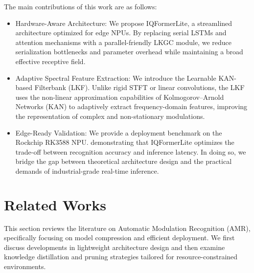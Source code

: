 \documentclass{article}
\begin{document}
	The main contributions of this work are as follows:
	\begin{itemize} 
		\item Hardware-Aware Architecture: We propose IQFormerLite, a streamlined architecture optimized for edge NPUs. By replacing serial LSTMs and attention mechanisms with a parallel-friendly LKGC module, we reduce serialization bottlenecks and parameter overhead while maintaining a broad effective receptive field. 
		\item Adaptive Spectral Feature Extraction: We introduce the Learnable KAN-based Filterbank (LKF). Unlike rigid STFT or linear convolutions, the LKF uses the non-linear approximation capabilities of Kolmogorov--Arnold Networks (KAN) to adaptively extract frequency-domain features, improving the representation of complex and non-stationary modulations. 
		\item Edge-Ready Validation: We provide a deployment benchmark on the Rockchip RK3588 NPU. demonstrating that IQFormerLite optimizes the trade-off between recognition accuracy and inference latency. In doing so, we bridge the gap between theoretical architecture design and the practical demands of industrial-grade real-time inference.
	\end{itemize}
	
	
	\section{Related Works}
	This section reviews the literature on Automatic Modulation Recognition (AMR), specifically focusing on model compression and efficient deployment. We first discuss developments in lightweight architecture design and then examine knowledge distillation and pruning strategies tailored for resource-constrained environments.
	
\end{document}
